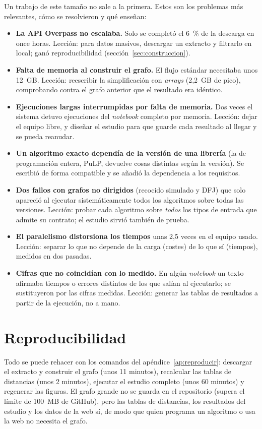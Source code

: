 Un trabajo de este tamaño no sale a la primera. Estos son los problemas más relevantes, cómo se resolvieron y qué enseñan:
\begin{itemize}
  \item \textbf{La API Overpass no escalaba.} Solo se completó el 6~\% de la descarga en once horas. Lección: para datos masivos, descargar un extracto y filtrarlo en local; ganó reproducibilidad (sección~\ref{sec:construccion}).
  \item \textbf{Falta de memoria al construir el grafo.} El flujo estándar necesitaba unos 12~GB. Lección: reescribir la simplificación con \emph{arrays} (2,2~GB de pico), comprobando contra el grafo anterior que el resultado era idéntico.
  \item \textbf{Ejecuciones largas interrumpidas por falta de memoria.} Dos veces el sistema detuvo ejecuciones del \emph{notebook} completo por memoria. Lección: dejar el equipo libre, y diseñar el estudio para que guarde cada resultado al llegar y se pueda reanudar.
  \item \textbf{Un algoritmo exacto dependía de la versión de una librería} (la de programación entera, PuLP, devuelve cosas distintas según la versión). Se escribió de forma compatible y se añadió la dependencia a los requisitos.
  \item \textbf{Dos fallos con grafos no dirigidos} (recocido simulado y DFJ) que solo apareció al ejecutar sistemáticamente todos los algoritmos sobre todas las versiones. Lección: probar cada algoritmo sobre \emph{todos} los tipos de entrada que admite su contrato; el estudio sirvió también de prueba.
  \item \textbf{El paralelismo distorsiona los tiempos} unas 2,5 veces en el equipo usado. Lección: separar lo que no depende de la carga (costes) de lo que sí (tiempos), medidos en dos pasadas.
  \item \textbf{Cifras que no coincidían con lo medido.} En algún \emph{notebook} un texto afirmaba tiempos o errores distintos de los que salían al ejecutarlo; se sustituyeron por las cifras medidas. Lección: generar las tablas de resultados a partir de la ejecución, no a mano.
\end{itemize}

\section{Reproducibilidad}

Todo se puede rehacer con los comandos del apéndice~\ref{ap:reproducir}: descargar el extracto y construir el grafo (unos 11 minutos), recalcular las tablas de distancias (unos 2 minutos), ejecutar el estudio completo (unos 60 minutos) y regenerar las figuras. El grafo grande no se guarda en el repositorio (supera el límite de 100~MB de
GitHub), pero las tablas de distancias, los resultados del estudio y los datos de la web sí, de modo que quien programa un algoritmo o usa la web no necesita el grafo.
